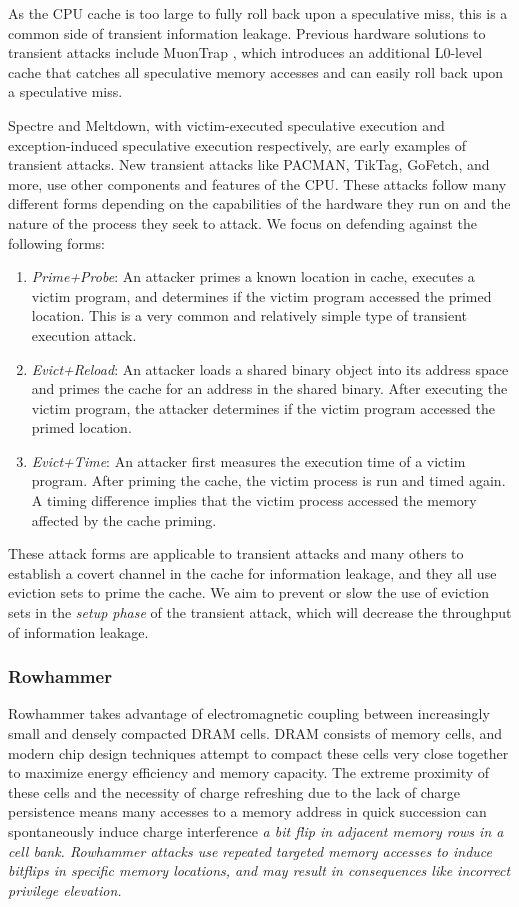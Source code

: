 \documentclass[letterpaper]{article}
\begin{document}
As the CPU cache is too large to fully roll back upon a speculative miss, this is a common side of transient information leakage.
Previous hardware solutions to transient attacks include MuonTrap \cite{MuonTrap},
which introduces an additional L0-level cache that catches all speculative memory accesses
and can easily roll back upon a speculative miss.

Spectre and Meltdown, with victim-executed speculative execution and exception-induced speculative execution respectively, 
are early examples of transient attacks.
New transient attacks like PACMAN, TikTag, GoFetch, and more, use other components and features of the CPU.
These attacks follow many different forms depending on the capabilities of the hardware they run on and the
nature of the process they seek to attack.
We focus on defending against the following forms:
\begin{enumerate}
    \item \textit{Prime+Probe}:
An attacker primes a known location in cache, executes a victim program, and determines 
if the victim program accessed the primed location. This is a very common and relatively simple
type of transient execution attack.
    \item \textit{Evict+Reload}:
An attacker loads a shared binary object into its address space and primes the cache for an address
in the shared binary.
After executing the victim program, the attacker determines if the victim program accessed the primed location.
    \item \textit{Evict+Time}:
An attacker first measures the execution time of a victim program.
After priming the cache, the victim process is run and timed again.
A timing difference implies that the victim process accessed the memory affected by the cache priming.
\end{enumerate}

These attack forms are applicable to transient attacks and many others to establish a covert channel in the cache for information leakage,
and they all use eviction sets to prime the cache.
We aim to prevent or slow the use of eviction sets in the \textit{setup phase} of the transient attack, which will decrease the throughput of information leakage.

\subsubsection{Rowhammer}

Rowhammer takes advantage of electromagnetic coupling
between increasingly small and densely compacted DRAM cells.
DRAM consists of memory cells, and modern chip design techniques attempt to compact these cells
very close together to maximize energy efficiency and memory capacity.
The extreme proximity of these cells and the necessity of charge refreshing
due to the lack of charge persistence means many accesses to a memory address
in quick succession can spontaneously induce charge interference \em a bit flip \em
in adjacent memory rows in a cell bank.
Rowhammer attacks use repeated targeted memory accesses to induce bitflips in specific memory locations,
and may result in consequences like incorrect privilege elevation.
\end{document}
